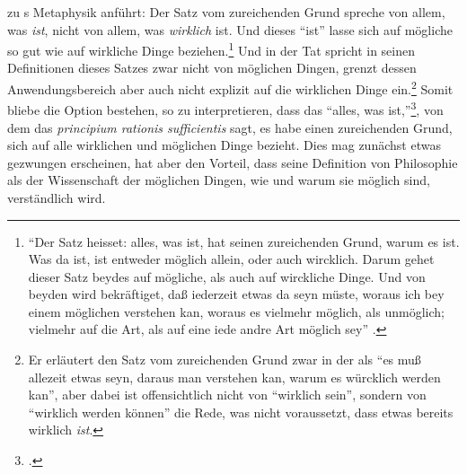 \begin{nummerierung}
zu s
Metaphysik anführt: Der Satz vom zureichenden Grund spreche von allem, was
\emph{ist}, nicht von allem, was \emph{wirklich} ist. Und dieses \enquote{ist}
lasse sich auf mögliche so gut wie auf wirkliche Dinge beziehen.\footnote{\enquote{Der Satz heisset:
alles, was ist, hat seinen zureichenden Grund, warum es ist. Was da ist, ist entweder möglich
allein, oder auch wircklich. Darum gehet dieser Satz beydes auf mögliche, als
auch auf wirckliche Dinge. Und von beyden wird bekräftiget, daß iederzeit etwas
da seyn müste, woraus ich bey einem möglichen verstehen kan, woraus es vielmehr
möglich, als unmöglich; vielmehr auf die Art, als auf eine iede andre Art
möglich sey}
\parencite[][\S~75]{Stiebritz:ErlaeuterungderWolffschenVernuenfftigenGedanckenvonGottderWeltundderSeeledesMenschenauchallenDingenueberhaupt1999}.}
Und in der Tat spricht
 in seinen
Definitionen dieses Satzes zwar nicht von möglichen Dingen, grenzt dessen
Anwendungsbereich aber auch nicht explizit auf die wirklichen Dinge
ein.\footnote{Er erläutert den Satz vom zureichenden Grund zwar in der
 als
\enquote{es muß allezeit etwas seyn, daraus man verstehen kan, warum es würcklich werden kan}, aber dabei ist offensichtlich nicht von \enquote{wirklich sein}, sondern von \enquote{wirklich werden können}
die Rede, was nicht voraussetzt, dass etwas bereits wirklich \emph{ist}.} Somit
bliebe die Option bestehen,
 so zu
interpretieren, dass das \enquote{alles, was
ist,}\footcite[][\S~30]{Wolff:VernuenftigeGedanckenvonGottderWeltundderSeeledesMenschenauchallenDingenueberhauptDeutscheMetaphysik1983},
von dem das \emph{principium rationis sufficientis} sagt, es habe einen
zureichenden Grund, sich auf alle wirklichen und möglichen Dinge
bezieht. Dies mag zunächst etwas gezwungen erscheinen, hat aber
den Vorteil, dass seine Definition von Philosophie als der Wissenschaft der möglichen Dingen, wie und
warum sie möglich sind, verständlich wird. 

\end{nummerierung}


